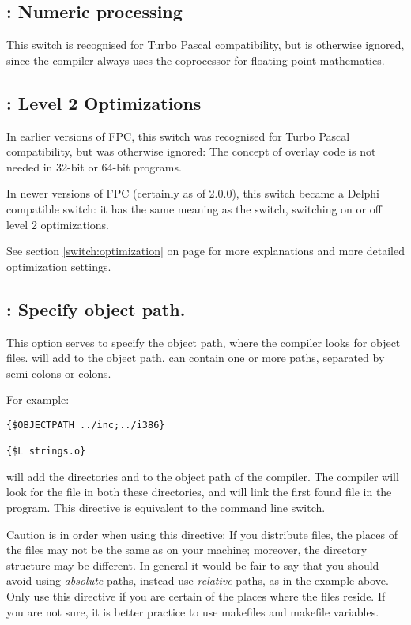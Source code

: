 \subsection{ : Numeric processing }

This switch is recognised for Turbo Pascal compatibility, but is otherwise
ignored, since the compiler always uses the coprocessor for floating point
mathematics.

\subsection{ : Level 2 Optimizations }

In earlier versions of FPC, this switch was recognised for Turbo Pascal 
compatibility, but was otherwise ignored: The concept of overlay code 
is not needed in 32-bit or 64-bit programs.

In newer versions of FPC (certainly as of 2.0.0), this switch became a
Delphi compatible switch: it has the same meaning as the
 switch, switching on or off level 2 optimizations.

See section \ref{switch:optimization} on page \pageref{switch:optimization}
for more explanations and more detailed optimization settings.

\subsection{ : Specify object path.}

This option serves to specify the object path, where the compiler looks for
object files.  will add  to the object
path.  can contain one or more paths, separated by semi-colons or
colons.

For example:
\begin{verbatim}
{$OBJECTPATH ../inc;../i386}

{$L strings.o}
\end{verbatim}

will add the directories  and  to the
object path of the compiler. The compiler will look for the file 
in both these directories, and will link the first found file in the
program. This directive is equivalent to the  command line switch.

Caution is in order when using this directive: If you distribute files, the
places of the files may not be the same as on your machine; moreover, the
directory structure may be different. In general it would be fair to say
that you should avoid using {\em absolute} paths, instead use {\em relative}
paths, as in the example above. Only use this directive if you are certain
of the places where the files reside. If you are not sure, it is better
practice to use makefiles and makefile variables.

